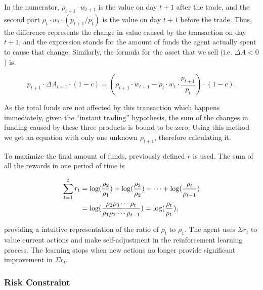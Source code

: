 \documentclass{mcmthesis}
\begin{document}
In the numerator,
$\rho _{t+1} \cdot w_{t+1}$ is the value on day $t+1$ after the trade,
and the second part $\rho _t \cdot w_t \cdot (p_{t+1} / p_t)$
is the value on day $t+1$ before the trade.
Thus, the difference represents the change in value caused by the transaction on day $t+1$,
and the expression stands for the amount of funds the agent actually spent
to cause that change.
Similarly, the formula for the asset that we sell (i.e. $\Delta A < 0$) is:

\begin{equation}
  p_{t+1} \cdot \Delta A_{t+1} \cdot (1 - c)
  = (\rho _{t+1} \cdot w_{t+1} - \rho _t \cdot w_t \cdot \frac{p_{t+1}}{p_t}) \cdot (1-c).
\end{equation}

As the total funds are not affected by this transaction which happens immediately,
given the ``instant trading'' hypothesis,
the sum of the changes in funding caused by these three products is bound to be zero.
Using this method we get an equation with only one unknown $\rho _{t+1}$,
therefore calculating it.

To maximize the final amount of funds,
previously defined $r$ is used.
The sum of all the rewards in one period of time is


\begin{align}
  \sum_{t=1}^t r_t &= \log(\frac{\rho_2}{\rho_1}) + \log(\frac{\rho_3}{\rho_2}) + \cdots + \log(\frac{\rho_t}{\rho_{t-1}}) \notag \\
  &= \log(\frac{\rho_2 \rho_3 \cdots \rho_t}{\rho_1 \rho_2 \cdots \rho_{t-1}}) = \log(\frac{\rho_t}{\rho_1}),
\end{align}

providing a intuitive representation of the ratio of $\rho_t$ to $\rho_1$.
The agent uses $\Sigma r_t$ to value current actions and make self-adjustment
in the reinforcement learning process.
The learning stops when new actions no longer provide significant improvement in $\Sigma r_t$.

\subsubsection{Risk Constraint}
\end{document}
